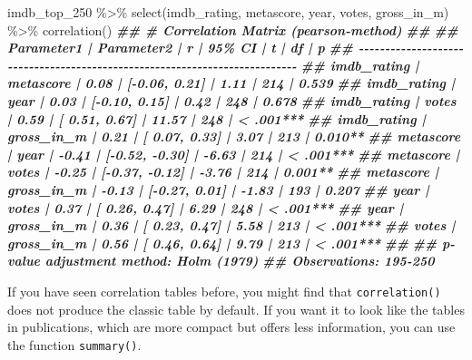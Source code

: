 \documentclass[
]{book}
\newenvironment{Shaded}{\begin{snugshade}}{\end{snugshade}}
\newcommand{\DocumentationTok}[1]{\textcolor[rgb]{0.56,0.35,0.01}{\textbf{\textit{#1}}}}
\newcommand{\FunctionTok}[1]{\textcolor[rgb]{0.00,0.00,0.00}{#1}}
\newcommand{\NormalTok}[1]{#1}
\newcommand{\SpecialCharTok}[1]{\textcolor[rgb]{0.00,0.00,0.00}{#1}}
\begin{document}
\begin{Shaded}
\begin{Highlighting}[]
\NormalTok{imdb\_top\_250 }\SpecialCharTok{\%\textgreater{}\%} 
  \FunctionTok{select}\NormalTok{(imdb\_rating, metascore, year, votes, gross\_in\_m) }\SpecialCharTok{\%\textgreater{}\%} 
  \FunctionTok{correlation}\NormalTok{()}
\DocumentationTok{\#\# \# Correlation Matrix (pearson{-}method)}
\DocumentationTok{\#\# }
\DocumentationTok{\#\# Parameter1  | Parameter2 |     r |         95\% CI |     t |  df |         p}
\DocumentationTok{\#\# {-}{-}{-}{-}{-}{-}{-}{-}{-}{-}{-}{-}{-}{-}{-}{-}{-}{-}{-}{-}{-}{-}{-}{-}{-}{-}{-}{-}{-}{-}{-}{-}{-}{-}{-}{-}{-}{-}{-}{-}{-}{-}{-}{-}{-}{-}{-}{-}{-}{-}{-}{-}{-}{-}{-}{-}{-}{-}{-}{-}{-}{-}{-}{-}{-}{-}{-}{-}{-}{-}{-}{-}{-}{-}{-}}
\DocumentationTok{\#\# imdb\_rating |  metascore |  0.08 | [{-}0.06,  0.21] |  1.11 | 214 | 0.539    }
\DocumentationTok{\#\# imdb\_rating |       year |  0.03 | [{-}0.10,  0.15] |  0.42 | 248 | 0.678    }
\DocumentationTok{\#\# imdb\_rating |      votes |  0.59 | [ 0.51,  0.67] | 11.57 | 248 | \textless{} .001***}
\DocumentationTok{\#\# imdb\_rating | gross\_in\_m |  0.21 | [ 0.07,  0.33] |  3.07 | 213 | 0.010**  }
\DocumentationTok{\#\# metascore   |       year | {-}0.41 | [{-}0.52, {-}0.30] | {-}6.63 | 214 | \textless{} .001***}
\DocumentationTok{\#\# metascore   |      votes | {-}0.25 | [{-}0.37, {-}0.12] | {-}3.76 | 214 | 0.001**  }
\DocumentationTok{\#\# metascore   | gross\_in\_m | {-}0.13 | [{-}0.27,  0.01] | {-}1.83 | 193 | 0.207    }
\DocumentationTok{\#\# year        |      votes |  0.37 | [ 0.26,  0.47] |  6.29 | 248 | \textless{} .001***}
\DocumentationTok{\#\# year        | gross\_in\_m |  0.36 | [ 0.23,  0.47] |  5.58 | 213 | \textless{} .001***}
\DocumentationTok{\#\# votes       | gross\_in\_m |  0.56 | [ 0.46,  0.64] |  9.79 | 213 | \textless{} .001***}
\DocumentationTok{\#\# }
\DocumentationTok{\#\# p{-}value adjustment method: Holm (1979)}
\DocumentationTok{\#\# Observations: 195{-}250}
\end{Highlighting}
\end{Shaded}

If you have seen correlation tables before, you might find that \texttt{correlation()} does not produce the classic table by default. If you want it to look like the tables in publications, which are more compact but offers less information, you can use the function \texttt{summary()}.
\end{document}
